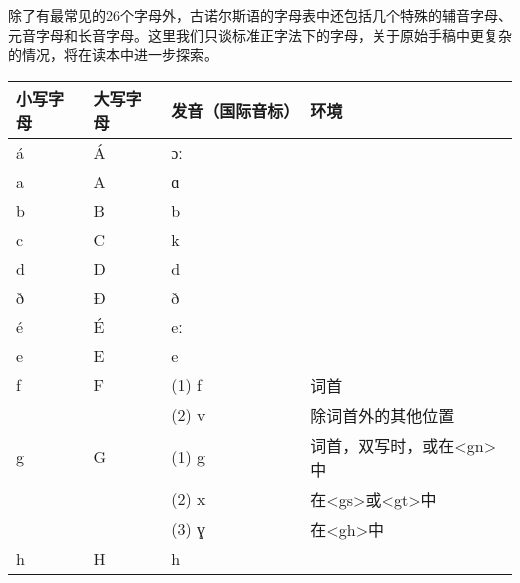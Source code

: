 除了有最常见的26个字母外，古诺尔斯语的字母表中还包括几个特殊的辅音字母、元音字母和长音字母。这里我们只谈标准正字法下的字母，关于原始手稿中更复杂的情况，将在读本中进一步探索。

\begin{table}[H]
    \centering
    \begin{tabular}{@{}llll@{}}
        \toprule
        小写字母 & 大写字母 & 发音（国际音标） & 环境                                                         \\ \midrule
        á        & Á        & ɔː               &                                                              \\
        a        & A        & ɑ                &                                                              \\
        b        & B        & b                &                                                              \\
        c        & C        & k                &                                                              \\
        d        & D        & d                &                                                              \\
        ð        & Ð        & ð                &                                                              \\
        é        & É        & eː               &                                                              \\
        e        & E        & e                &                                                              \\
        f        & F        & (1) f            & 词首                                                         \\
                 &          & (2) v            & 除词首外的其他位置                                           \\
        g        & G        & (1) g            & 词首，双写时，或在\textless{}gn\textgreater{}中              \\
                 &          & (2) x            & 在\textless{}gs\textgreater{}或\textless{}gt\textgreater{}中 \\
                 &          & (3) ɣ            & 在\textless{}gh\textgreater{}中                              \\
        h        & H        & h                &                                                              \\

\end{tabular}
\end{table}
